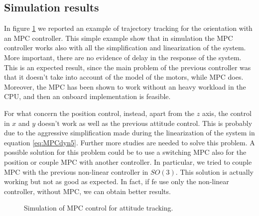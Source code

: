 \subsection{Simulation results}

\noindent In figure \ref{fig:MPC1} we reported an example of trajectory tracking for the orientation with an MPC controller. This simple example show that in simulation the MPC controller works also with all the simplification and linearization of the system. More important, there are no evidence of delay in the response of the system. This is an expected result, since the main problem of the previous controller was that it doesn't take into account of the model of the motors, while MPC does. Moreover, the MPC has been shown to work without an heavy workload in the CPU, and then an onboard implementation is feasible. 

\noindent For what concern the position control, instead, apart from the $z$ axis, the control in $x$ and $y$ doesn't work as well as the previous attitude control. This is probably due to the aggressive simplification made during the linearization of the system in equation \eqref{eq:MPCdyn5}. Further more studies are needed to solve this problem. A possible solution for this problem could be to use a switching MPC also for the position or couple MPC with another controller. In particular, we tried to couple MPC with the previous non-linear controller in $SO(3)$. This solution is actually working but not as good as expected. In fact, if fe use only the non-linear controller, without MPC, we can obtain better results. 

\begin{figure}[h]
	\centering
	
	\caption{Simulation of MPC control for attitude tracking.}
	\label{fig:MPC1}		
\end{figure}

